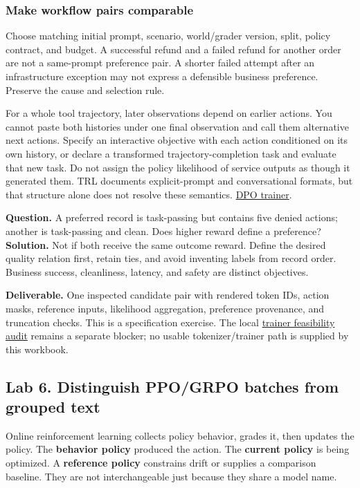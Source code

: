 \documentclass[
  11pt,
  letterpaper,
]{article}
\begin{document}
\subsubsection{Make workflow pairs
comparable}\label{make-workflow-pairs-comparable}

Choose matching initial prompt, scenario, world/grader version, split,
policy contract, and budget. A successful refund and a failed refund for
another order are not a same-prompt preference pair. A shorter failed
attempt after an infrastructure exception may not express a defensible
business preference. Preserve the cause and selection rule.

For a whole tool trajectory, later observations depend on earlier
actions. You cannot paste both histories under one final observation and
call them alternative next actions. Specify an interactive objective
with each action conditioned on its own history, or declare a
transformed trajectory-completion task and evaluate that new task. Do
not assign the policy likelihood of service outputs as though it
generated them. TRL documents explicit-prompt and conversational
formats, but that structure alone does not resolve these semantics.
\href{https://huggingface.co/docs/trl/main/en/dpo_trainer}{DPO trainer}.

\textbf{Question.} A preferred record is task-passing but contains five
denied actions; another is task-passing and clean. Does higher reward
define a preference? \textbf{Solution.} Not if both receive the same
outcome reward. Define the desired quality relation first, retain ties,
and avoid inventing labels from record order. Business success,
cleanliness, latency, and safety are distinct objectives.

\textbf{Deliverable.} One inspected candidate pair with rendered token
IDs, action masks, reference inputs, likelihood aggregation, preference
provenance, and truncation checks. This is a specification exercise. The
local \href{../trainer-preprocessing-feasibility.md}{trainer feasibility
audit} remains a separate blocker; no usable tokenizer/trainer path is
supplied by this workbook.

\subsection{Lab 6. Distinguish PPO/GRPO batches from grouped
text}\label{lab-6.-distinguish-ppogrpo-batches-from-grouped-text}

Online reinforcement learning collects policy behavior, grades it, then
updates the policy. The \textbf{behavior policy} produced the action.
The \textbf{current policy} is being optimized. A \textbf{reference
policy} constrains drift or supplies a comparison baseline. They are not
interchangeable just because they share a model name.
\end{document}
